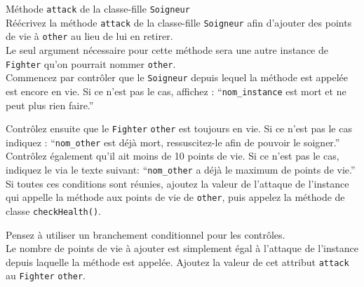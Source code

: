 \begin{Exercice}[10 minutes] Méthode \lstinline{attack} de la classe-fille \lstinline{Soigneur} \\

Réécrivez la méthode \lstinline{attack} de la classe-fille \lstinline{Soigneur} afin d'ajouter des points de vie à \lstinline{other} au lieu de lui en retirer. \\

Le seul argument nécessaire pour cette méthode sera une autre instance de \lstinline{Fighter} qu'on pourrait nommer \lstinline{other}. \\

Commencez par contrôler que le \lstinline{Soigneur} depuis lequel la méthode est appelée est encore en vie. Si ce n'est pas le cas, affichez : ``\lstinline{nom_instance} est mort et ne peut plus rien faire.''

Contrôlez ensuite que le \lstinline{Fighter} \lstinline{other} est toujours en vie. Si ce n'est pas le cas indiquez : ``\lstinline{nom_other} est déjà mort, ressuscitez-le afin de pouvoir le soigner.'' Contrôlez également qu'il ait moins de 10 points de vie. Si ce n'est pas le cas, indiquez le via le texte suivant: ``\lstinline{nom_other} a déjà le maximum de points de vie.'' \\

Si toutes ces conditions sont réunies, ajoutez la valeur de l'attaque de l'instance qui appelle la méthode aux points de vie de \lstinline{other}, puis appelez la méthode de classe \lstinline{checkHealth()}.

\begin{conseil}
Pensez à utiliser un branchement conditionnel pour les contrôles. \\

Le nombre de points de vie à ajouter est simplement égal à l'attaque de l'instance depuis laquelle la méthode est appelée. Ajoutez la valeur de cet attribut \lstinline{attack} au \lstinline{Fighter} \lstinline{other}.

\end{conseil}

\begin{solution}
	
\end{solution}

\end{Exercice}

